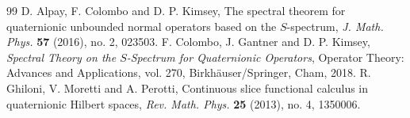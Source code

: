 \documentclass[10pt,a4paper]{amsart}
\theoremstyle{plain}
\theoremstyle{definition}
\theoremstyle{remark}
\begin{document}
\begin{thebibliography}{99}
 D. Alpay, F. Colombo and D. P. Kimsey, The spectral theorem for quaternionic unbounded normal operators based on the $S$-spectrum, \emph{J. Math. Phys.} \textbf{57} (2016), no. 2, 023503.
 F. Colombo, J. Gantner and D. P. Kimsey, \emph{Spectral Theory on the $S$-Spectrum for Quaternionic Operators}, Operator Theory: Advances and Applications, vol. 270, Birkh\"auser/Springer, Cham, 2018.
 R. Ghiloni, V. Moretti and A. Perotti, Continuous slice functional calculus in quaternionic Hilbert spaces, \emph{Rev. Math. Phys.} \textbf{25} (2013), no. 4, 1350006.
\end{thebibliography}
\end{document}
